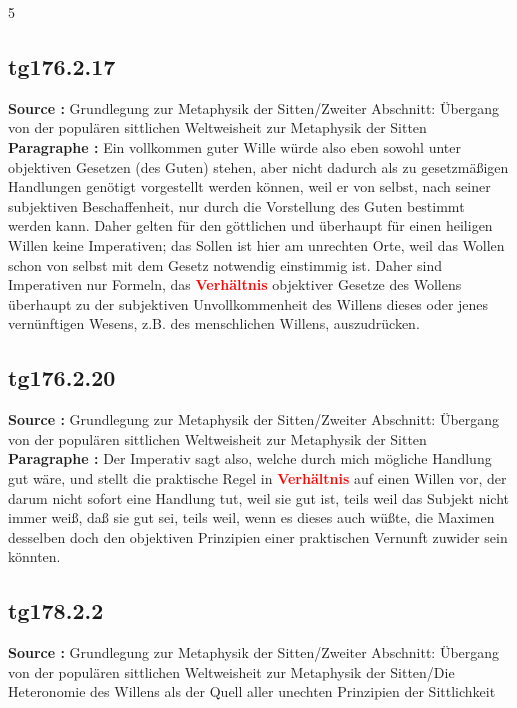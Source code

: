 \documentclass[a4paper,12pt,twoside]{book}
\newcommand{\match}[1]{\textcolor{red}{\textbf{#1}}}
\begin{document}
	
	5
	
	
	
	\subsection*{tg176.2.17} 
	\textbf{Source : }Grundlegung zur Metaphysik der Sitten/Zweiter Abschnitt: Übergang von der populären sittlichen Weltweisheit zur Metaphysik der Sitten\\  
	
	\noindent\textbf{Paragraphe : }Ein vollkommen guter Wille würde also eben sowohl unter objektiven Gesetzen (des Guten) stehen, aber nicht dadurch als zu gesetzmäßigen Handlungen genötigt vorgestellt werden können, weil er von selbst, nach seiner subjektiven Beschaffenheit, nur durch die Vorstellung des Guten  bestimmt werden kann. Daher gelten für den göttlichen und überhaupt für einen heiligen Willen keine Imperativen; das Sollen ist hier am unrechten Orte, weil das Wollen schon von selbst mit dem Gesetz notwendig einstimmig ist. Daher sind Imperativen nur Formeln, das \match{Verhältnis} objektiver Gesetze des Wollens überhaupt zu der subjektiven Unvollkommenheit des Willens dieses oder jenes vernünftigen Wesens, z.B. des menschlichen Willens, auszudrücken. 
	
	\subsection*{tg176.2.20} 
	\textbf{Source : }Grundlegung zur Metaphysik der Sitten/Zweiter Abschnitt: Übergang von der populären sittlichen Weltweisheit zur Metaphysik der Sitten\\  
	
	\noindent\textbf{Paragraphe : }Der Imperativ sagt also, welche durch mich mögliche Handlung gut wäre, und stellt die praktische Regel in \match{Verhältnis} auf einen Willen vor, der darum nicht sofort eine Handlung tut, weil sie gut ist, teils weil das Subjekt nicht immer weiß, daß sie gut sei, teils weil, wenn es dieses auch wüßte, die Maximen desselben doch den objektiven Prinzipien einer praktischen Vernunft zuwider sein könnten. 
	
	\subsection*{tg178.2.2} 
	\textbf{Source : }Grundlegung zur Metaphysik der Sitten/Zweiter Abschnitt: Übergang von der populären sittlichen Weltweisheit zur Metaphysik der Sitten/Die Heteronomie des Willens als der Quell aller unechten Prinzipien der Sittlichkeit\\  
	
\end{document}
